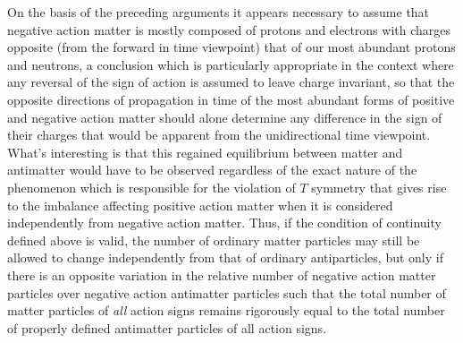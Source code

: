 \documentclass[notitlepage,12pt]{report}
\begin{document}
On the basis of the preceding arguments it appears necessary to assume that negative action matter is mostly composed of protons and electrons with charges opposite (from the forward in time viewpoint) that of our most abundant protons and neutrons, a conclusion which is particularly appropriate in the context where any reversal of the sign of action is assumed to leave charge invariant, so that the opposite directions of propagation in time of the most abundant forms of positive and negative action matter should alone determine any difference in the sign of their charges that would be apparent from the unidirectional time viewpoint. What's interesting is that this regained equilibrium between matter and antimatter would have to be observed regardless of the exact nature of the phenomenon which is responsible for the violation of $T$ symmetry that gives rise to the imbalance affecting positive action matter when it is considered independently from negative action matter. Thus, if the condition of continuity defined above is valid, the number of ordinary matter particles may still be allowed to change independently from that of ordinary antiparticles, but only if there is an opposite variation in the relative number of negative action matter particles over negative action antimatter particles such that the total number of matter particles of \textit{all} action signs remains rigorously equal to the total number of properly defined antimatter particles of all action signs.
\end{document}

